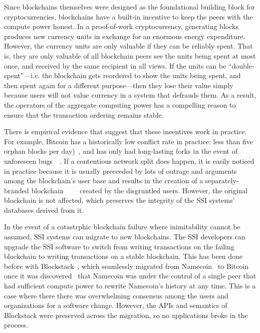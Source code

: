 Since blockchains themselves were designed as the foundational building block for
cryptocurrencies, blockchains have a built-in incentive to keep the peers
with the compute power honest.  In a proof-of-work cryptocurrency, generating blocks produces
new currency units in exchange for an enormous energy expenditure.  However, the
currency units are only valuable if they can be reliably
spent.  That is, they are only valuable of all blockchain peers see the units
being spent at most once, and received by the same recipient in all views.
If the units can be ``double-spent''---i.e. the
blockchain gets reordered to show the units being spent, and
then spent again for a different purpose---then they lose their value simply
because users will not value currency in a system that defrauds them.  As a
result, the operators of the aggregate computing power has a compelling
reason to ensure that the transaction ordering remains stable.

There is empirical evidence that suggest that these incentives work in practice.  For
example, Bitcoin has a historically low conflict rate in practice:  
less than five orphan blocks per
day)~\cite{blockchain-info-orphan-rate}, and has only had long-lasting forks in
the event of unforeseen bugs~\cite{bitcoin-deep-fork}~\cite{bitcoin-cve}.  If a contentious network
split does happen, it is easily noticed in practice because it is usually
preceeded by lots of outrage and arguments among the blockchain's user
base and results in the creation of a
separately-branded
blockchain~\cite{bcash}~\cite{ethereum-classic}~\cite{zcash-classic}~\cite{expanse}
created by the disgruntled users.  However, the original blockchain is not
affected, which preserves the integrity of the SSI systems' databases derived
from it.

In the event of a catastrphic blockchain failure where inimitability
cannot be assumed, SSI systems can migrate to new blockchains.  The SSI
developers can upgrade the SSI software to switch from writing transactions on
the failing blockchain to writing transactions on a stable blockchain.  This has
been done before with Blockstack~\cite{blockstack-namecoin-migration}, which
seamlessly migrated from Namecoin~\cite{namecoin} to Bitcoin once it was
discovered~\cite{blockstack} that Namecoin was under the control of a single
peer that had sufficient compute power to rewrite Namecoin's history
at any time.  This is a case where there there was overwhelming consensus among
the users and organizations for a software change.  However, the APIs and
semantics of Blockstack were preserved across the migration, so no applications
broke in the process.

